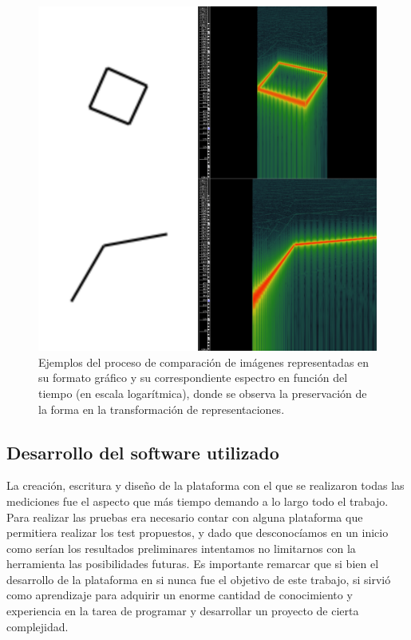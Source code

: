 \documentclass{article}
\begin{document}
    \begin{figure}
        \center
        \includegraphics[width=\textwidth]{Imagenes/TranformacionSVG.png}
        \caption{Ejemplos del proceso de comparación de imágenes representadas en su formato gráfico y su correspondiente espectro en función del tiempo (en escala logarítmica), donde se observa la preservación de la forma en la transformación de representaciones.}
        \label{fig:TransformacionSVG}
    \end{figure}

    
\subsection{Desarrollo del software utilizado}

    La creación, escritura y diseño de la plataforma con el que se realizaron todas las mediciones fue el aspecto que más tiempo demando a lo largo todo el trabajo. Para realizar las pruebas era necesario contar con alguna plataforma que permitiera realizar los test propuestos, y dado que desconocíamos en un inicio como serían los resultados preliminares intentamos no limitarnos con la herramienta las posibilidades futuras. Es importante remarcar que si bien el desarrollo de la plataforma en si nunca fue el objetivo de este trabajo, si sirvió como aprendizaje para adquirir un enorme cantidad de conocimiento y experiencia en la tarea de programar y desarrollar un proyecto de cierta complejidad. 
    
\end{document}
